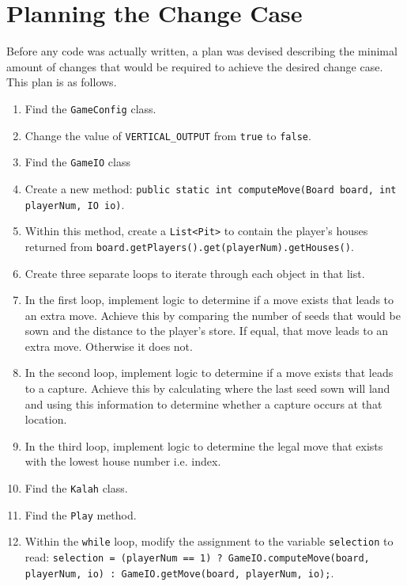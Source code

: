 \documentclass[10pt, a4paper, conference]{IEEEtran}
\begin{document}
\section{Planning the Change Case}
Before any code was actually written, a plan was devised describing the minimal
amount of changes that would be required to achieve the desired change case.
This plan is as follows.
\begin{enumerate}
  \item Find the \texttt{GameConfig} class.
  \item Change the value of \texttt{VERTICAL\_OUTPUT} from \texttt{true} to
    \texttt{false}.
  \item Find the \texttt{GameIO} class
  \item Create a new method: \texttt{public static int computeMove(Board board,
    int playerNum, IO io)}.
  \item Within this method, create a \texttt{List<Pit>} to contain the player's
    houses returned from
    \texttt{board.getPlayers().get(playerNum).getHouses()}.
  \item Create three separate loops to iterate through each object in that
    list.
  \item In the first loop, implement logic to determine if a move exists that
    leads to an extra move. Achieve this by comparing the number of seeds that
    would be sown and the distance to the player's store. If equal, that move
    leads to an extra move. Otherwise it does not.
  \item In the second loop, implement logic to determine if a move exists that
    leads to a capture. Achieve this by calculating where the last seed sown
    will land and using this information to determine whether a capture occurs
    at that location.
  \item In the third loop, implement logic to determine the legal move that
    exists with the lowest house number i.e. index.
  \item Find the \texttt{Kalah} class.
  \item Find the \texttt{Play} method.
  \item Within the \texttt{while} loop, modify the assignment to the variable
    \texttt{selection} to read: \texttt{selection = (playerNum == 1)
    ? GameIO.computeMove(board, playerNum, io) : GameIO.getMove(board,
    playerNum, io);}.
\end{enumerate}
\end{document}
